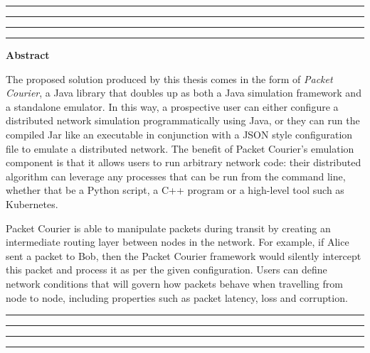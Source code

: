 \thispagestyle{empty}
\hrule\hrule\hrule\hrule %
\begin{center}
    \textbf{\large Abstract}
    \\
\end{center}

\noindent
The proposed solution produced by this thesis comes in the form of \emph{Packet Courier}, a Java library that doubles
up as both a Java simulation framework and a standalone emulator. In this way, a prospective user can either
configure a distributed network simulation programmatically using Java, or they can run the compiled Jar like an
executable in conjunction with a JSON style configuration file to emulate a distributed network. The benefit of
Packet Courier's emulation component is that it allows users to run arbitrary network code: their distributed
algorithm can leverage any processes that can be run from the command line, whether that be a Python script, a
C++ program or a high-level tool such as Kubernetes.

Packet Courier is able to manipulate packets during transit by creating an intermediate routing layer between nodes
in the network. For example, if Alice sent a packet to Bob, then the Packet Courier framework would silently
intercept this packet and process it as per the given configuration. Users can define network conditions that will
govern how packets behave when travelling from node to node, including properties such as packet latency, loss and
corruption.


\vfill
\hrule\hrule\hrule\hrule
\clearpage
